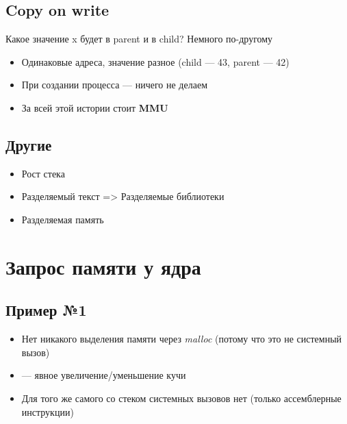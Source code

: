 \documentclass[../../lectures.tex]{subfiles}
\begin{document}
\subsection{Copy on write}
Какое значение x будет в parent и в child?
\newpage
Немного по-другому
\begin{itemize}
    \item Одинаковые адреса, значение разное (child --- 43, parent --- 42)
    \item При создании процесса --- ничего не делаем
    \item За всей этой истории стоит \textbf{MMU}
\end{itemize}

\subsection{Другие}
\begin{itemize}
    \item Рост стека
    \item Разделяемый текст => Разделяемые библиотеки
    \item Разделяемая память
\end{itemize}

\newpage
\section{Запрос памяти у ядра}
\subsection{Пример №1}


\begin{itemize}
    \item Нет никакого выделения памяти через \emph{malloc} (потому что это не системный вызов)
    \item {} --- явное увеличение/уменьшение кучи
    \item Для того же самого со стеком системных вызовов нет (только ассемблерные инструкции)
\end{itemize}
\end{document}
